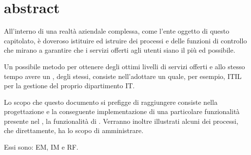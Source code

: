 %
%
\chapter[Abstract]{abstract}
\label{abs}
All'interno di una realtà aziendale complessa, come l'ente oggetto di questo capitolato, è doveroso istituire ed istruire dei processi e delle funzioni di controllo che mirano a garantire che i servizi offerti agli utenti siano il più  ed  possibile.

Un possibile metodo per ottenere degli ottimi livelli di servizi offerti e allo stesso tempo avere un , degli stessi, consiste nell'adottare un  quale, per esempio, \ac{ITIL} per la gestione del proprio dipartimento \acs{IT}.

Lo scopo che questo documento si prefigge di raggiungere consiste nella progettazione e la conseguente implementazione di una particolare funzionalità presente nel , la funzionalità di . Verranno inoltre illustrati alcuni dei processi, che direttamente, ha lo scopo di amministrare.

Essi sono: \acf{EM}, \acf{IM} e \acf{RF}.





